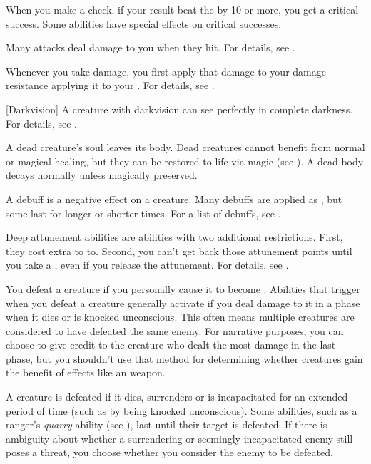  When you make a check, if your result beat the  by 10 or more, you get a critical success.
Some abilities have special effects on critical successes.

 Many attacks deal damage to you when they hit.
For details, see .

 Whenever you take damage, you first apply that damage to your damage resistance applying it to your .
For details, see .

[Darkvision] A creature with darkvision can see perfectly in complete darkness.
For details, see .

 A dead creature's soul leaves its body. Dead creatures cannot benefit from normal or magical healing, but they can be restored to life via magic (see ). A dead body decays normally unless magically preserved.

 A debuff is a negative effect on a creature.
Many debuffs are applied as , but some last for longer or shorter times.
For a list of debuffs, see .

 Deep attunement abilities are  abilities with two additional restrictions.
First, they cost extra  to  to.
Second, you can't get back those attunement points until you take a , even if you release the attunement.
For details, see .

 You defeat a creature if you personally cause it to become .
Abilities that trigger when you defeat a creature generally activate if you deal damage to it in a phase when it dies or is knocked unconscious.
This often means multiple creatures are considered to have defeated the same enemy.
For narrative purposes, you can choose to give credit to the creature who dealt the most damage in the last phase, but you shouldn't use that method for determining whether creatures gain the benefit of effects like an  weapon.

 A creature is defeated if it dies, surrenders or is incapacitated for an extended period of time (such as by being knocked unconscious).
Some abilities, such as a ranger's \textit{quarry} ability (see ), last until their target is defeated.
If there is ambiguity about whether a surrendering or seemingly incapacitated enemy still poses a threat, you choose whether you consider the enemy to be defeated.

